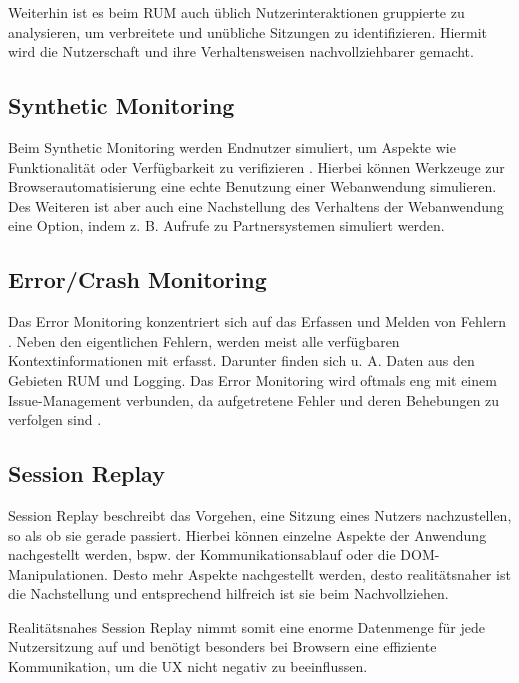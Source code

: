 Weiterhin ist es beim RUM auch üblich Nutzerinteraktionen gruppierte zu analysieren, um verbreitete und unübliche Sitzungen zu identifizieren. Hiermit wird die Nutzerschaft und ihre Verhaltensweisen nachvollziehbarer gemacht.

\subsection{Synthetic Monitoring}

Beim Synthetic Monitoring werden Endnutzer simuliert, um Aspekte wie Funktionalität oder Verfügbarkeit zu verifizieren \cite{IdentifyingWebPerformanceDegradations}. Hierbei können Werkzeuge zur Browserautomatisierung eine echte Benutzung einer Webanwendung simulieren. Des Weiteren ist aber auch eine Nachstellung des Verhaltens der Webanwendung eine Option, indem z. B. Aufrufe zu Partnersystemen simuliert werden.

\subsection{Error/Crash Monitoring}

Das Error Monitoring konzentriert sich auf das Erfassen und Melden von Fehlern \cite{CrashbinCrashMonitoring}. Neben den eigentlichen Fehlern, werden meist alle verfügbaren Kontextinformationen mit erfasst. Darunter finden sich u. A. Daten aus den Gebieten RUM und Logging. Das Error Monitoring wird oftmals eng mit einem Issue-Management verbunden, da aufgetretene Fehler und deren Behebungen zu verfolgen sind \cite{CrashbinCrashMonitoring}.

\subsection{Session Replay}

Session Replay beschreibt das Vorgehen, eine Sitzung eines Nutzers nachzustellen, so als ob sie gerade passiert. Hierbei können einzelne Aspekte der Anwendung nachgestellt werden, bspw. der Kommunikationsablauf oder die DOM-Manipulationen. Desto mehr Aspekte nachgestellt werden, desto realitätsnaher ist die Nachstellung und entsprechend hilfreich ist sie beim Nachvollziehen.

Realitätsnahes Session Replay nimmt somit eine enorme Datenmenge für jede Nutzersitzung auf und benötigt besonders bei Browsern eine effiziente Kommunikation, um die UX nicht negativ zu beeinflussen.

